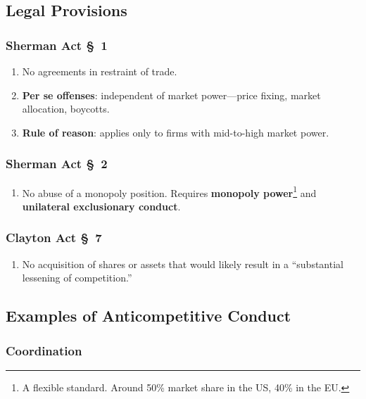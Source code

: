 \subsection{Legal Provisions}

\subsubsection{Sherman Act \S\ 1}

\begin{enumerate}
    \item No agreements in restraint of trade.
    \item \textbf{Per se offenses}: independent of market power---price fixing, 
    market allocation, boycotts.
    \item \textbf{Rule of reason}: applies only to firms with mid-to-high market 
    power.
\end{enumerate}

\subsubsection{Sherman Act \S\ 2}

\begin{enumerate}
    \item No abuse of a monopoly position. Requires \textbf{monopoly 
    power}\footnote{A flexible standard. Around 50\% market share in the US, 
    40\% in the EU.} and \textbf{unilateral exclusionary conduct}.
\end{enumerate}

\subsubsection{Clayton Act \S\ 7}

\begin{enumerate}
    \item No acquisition of shares or assets that would likely result in a 
    ``substantial lessening of competition.''
\end{enumerate}

\subsection{Examples of Anticompetitive Conduct}

\subsubsection{Coordination}

